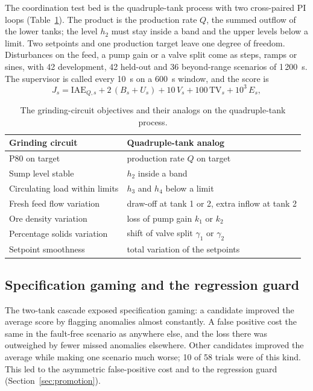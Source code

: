 The coordination test bed is the quadruple-tank process with two
cross-paired PI loops (Table~\ref{tab:coord-analog}). The product is the
production rate $Q$, the summed outflow of the lower tanks; the level $h_2$
must stay inside a band and the upper levels below a limit. Two setpoints and
one production target leave one degree of freedom. Disturbances on the feed,
a pump gain or a valve split come as steps, ramps or sines, with 42
development, 42 held-out and 36 beyond-range scenarios of 1\,200~s. The
supervisor is called every 10~s on a 600~s window, and the score is
\begin{equation}
  J_s = \mathrm{IAE}_{Q,s} + 2\,(B_s + U_s) + 10\,V_s + 100\,\mathrm{TV}_s
        + 10^3\,E_s ,
  \label{eq:coord-score}
\end{equation}

\begin{table}[tb]
  \centering
  \caption{The grinding-circuit objectives and their analogs on the
    quadruple-tank process.}
  \label{tab:coord-analog}
  \begin{tabular}{@{}ll@{}}
    \toprule
    Grinding circuit & Quadruple-tank analog \\
    \midrule
    P80 on target                  & production rate $Q$ on target \\
    Sump level stable              & $h_2$ inside a band \\
    Circulating load within limits & $h_3$ and $h_4$ below a limit \\
    Fresh feed flow variation      & draw-off at tank 1 or 2, extra inflow at tank 2 \\
    Ore density variation          & loss of pump gain $k_1$ or $k_2$ \\
    Percentage solids variation    & shift of valve split $\gamma_1$ or $\gamma_2$ \\
    Setpoint smoothness            & total variation of the setpoints \\
    \bottomrule
  \end{tabular}
\end{table}

\subsection{Specification gaming and the regression guard}
\label{sec:tank-gaming}
The two-tank cascade exposed specification gaming: a candidate
improved the average score by flagging anomalies almost constantly. A false
positive cost the same in the fault-free scenario as anywhere else, and the
loss there was outweighed by fewer missed anomalies elsewhere. Other
candidates improved the average while making one scenario much worse; 10 of
58 trials were of this kind. This led to the asymmetric false-positive cost
and to the regression guard (Section~\ref{sec:promotion}).


